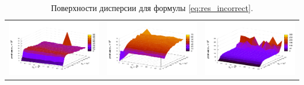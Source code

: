 \documentclass[12pt,a4paper]{article}
\theoremstyle{definition}
\begin{document}
\begin{table}[h]
\begin{tabular}{c c c}
	\includegraphics[scale=0.4]{figs/all/p1.txt_coeff2.dat.pdf} & \includegraphics[scale=0.4]{figs/all/p2.txt_coeff2.dat.pdf} & \includegraphics[scale=0.4]{figs/all/p3.txt_coeff2.dat.pdf} %
  \end{tabular}
  \caption{Поверхности дисперсии для формулы \eqref{eq:res_incorrect}.}
  \label{tabl:res_incorrect}
\end{table}
\end{document}
